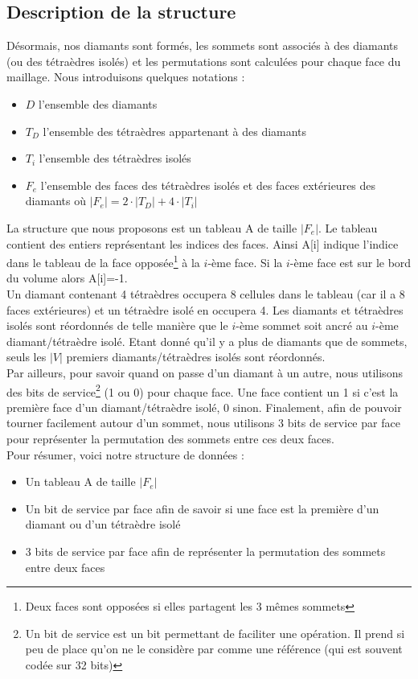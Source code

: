 \subsection{Description de la structure}
\noindent
Désormais, nos diamants sont formés, les sommets sont associés à des diamants (ou des tétraèdres isolés) et les permutations sont calculées pour chaque face du maillage. Nous introduisons quelques notations :
\begin{itemize}
\item $D$ l'ensemble des diamants
\item $T_D$ l'ensemble des tétraèdres appartenant à des diamants
\item $T_i$ l'ensemble des tétraèdres isolés
\item $F_e$ l'ensemble des faces des tétraèdres isolés et des faces extérieures des diamants où $|F_e|=2\cdot |T_D|+4\cdot |T_i|$\\
\end{itemize}
\noindent
La structure que nous proposons est un tableau A de taille $|F_e|$. Le tableau contient des entiers représentant les indices des faces. Ainsi A[i] indique l'indice dans le tableau de la face opposée\footnote{Deux faces sont opposées si elles partagent les 3 mêmes sommets} à la $i$-ème face. Si la $i$-ème face est sur le bord du volume alors A[i]=-1.\\ 
Un diamant contenant 4 tétraèdres occupera 8 cellules dans le tableau (car il a 8 faces extérieures) et un tétraèdre isolé en occupera 4. Les diamants et tétraèdres isolés sont réordonnés de telle manière que le $i$-ème sommet soit ancré au $i$-ème diamant/tétraèdre isolé. Etant donné qu'il y a plus de diamants que de sommets, seuls les $|V|$ premiers diamants/tétraèdres isolés sont réordonnés.\\
Par ailleurs, pour savoir quand on passe d'un diamant à un autre, nous utilisons des bits de service\footnote{Un bit de service est un bit permettant de faciliter une opération. Il prend si peu de place qu'on ne le considère par comme une référence (qui est souvent codée sur 32 bits)} (1 ou 0) pour chaque face. Une face contient un 1 si c'est la première face d'un diamant/tétraèdre isolé, 0 sinon. Finalement, afin de pouvoir tourner facilement autour d'un sommet, nous utilisons 3 bits de service par face pour représenter la permutation des sommets entre ces deux faces.\\
Pour résumer, voici notre structure de données :
\begin{itemize}
\item Un tableau A de taille $|F_e|$
\item Un bit de service par face afin de savoir si une face est la première d'un diamant ou d'un tétraèdre isolé
\item 3 bits de service par face afin de représenter la permutation des sommets entre deux faces
\end{itemize}
